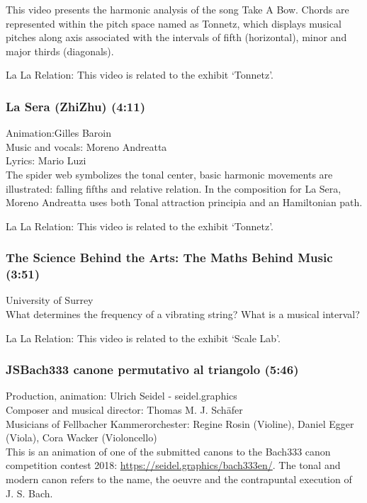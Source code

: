 This video presents the harmonic analysis of the song Take A Bow. Chords are represented within the pitch space named as Tonnetz, which displays musical pitches along axis associated with the intervals of fifth (horizontal), minor and major thirds (diagonals).

La La Relation: This video is related to the exhibit `Tonnetz'.

\subsubsection*{La Sera (ZhiZhu) (4:11)}
Animation:Gilles Baroin\\
Music and vocals: Moreno Andreatta\\
Lyrics: Mario Luzi\\

The spider web symbolizes the tonal center, basic harmonic movements are illustrated: falling fifths and relative relation. In the composition for La Sera, Moreno Andreatta uses both Tonal attraction principia and an Hamiltonian path. 

La La Relation: This video is related to the exhibit `Tonnetz'.

\subsubsection*{The Science Behind the Arts: The Maths Behind Music (3:51)}
University of Surrey\\

What determines the frequency of a vibrating string? What is a musical interval?

La La Relation: This video is related to the exhibit `Scale Lab'.

\subsubsection*{JSBach333 canone permutativo al triangolo (5:46)}
Production, animation: Ulrich Seidel - seidel.graphics\\
Composer and musical director: Thomas M. J. Schäfer\\ 
Musicians of Fellbacher Kammerorchester: Regine Rosin (Violine), Daniel Egger (Viola), Cora Wacker (Violoncello) \\

This is an animation of one of the submitted canons to the Bach333 canon competition contest 2018: \url{https://seidel.graphics/bach333en/}. The tonal and modern canon refers to the name, the oeuvre and the contrapuntal execution of J. S. Bach.

